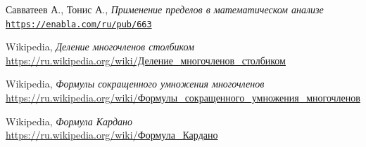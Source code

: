 \documentclass[12pt]{article}
\begin{document}
\begin{thebibliography}{9}
	Савватеев А., Тонис А., \textit{Применение пределов в математическом анализе}
	\\\texttt{\url{https://enabla.com/ru/pub/663}}
	
	Wikipedia, \textit{Деление многочленов столбиком}
	\\\href{https://ru.wikipedia.org/wiki/\%D0\%94\%D0\%B5\%D0\%BB\%D0\%B5\%D0\%BD\%D0\%B8\%D0\%B5_\%D0\%BC\%D0\%BD\%D0\%BE\%D0\%B3\%D0\%BE\%D1\%87\%D0\%BB\%D0\%B5\%D0\%BD\%D0\%BE\%D0\%B2_\%D1\%81\%D1\%82\%D0\%BE\%D0\%BB\%D0\%B1\%D0\%B8\%D0\%BA\%D0\%BE\%D0\%BC}{https://ru.wikipedia.org/wiki/Деление\_многочленов\_столбиком}

	Wikipedia, \textit{Формулы сокращенного умножения многочленов}
	\\\href{https://ru.wikipedia.org/wiki/\%D0\%A4\%D0\%BE\%D1\%80\%D0\%BC\%D1\%83\%D0\%BB\%D1\%8B\_\%D1\%81\%D0\%BE\%D0\%BA\%D1\%80\%D0\%B0\%D1\%89\%D1\%91\%D0\%BD\%D0\%BD\%D0\%BE\%D0\%B3\%D0\%BE\_\%D1\%83\%D0\%BC\%D0\%BD\%D0\%BE\%D0\%B6\%D0\%B5\%D0\%BD\%D0\%B8\%D1\%8F\_\%D0\%BC\%D0\%BD\%D0\%BE\%D0\%B3\%D0\%BE\%D1\%87\%D0\%BB\%D0\%B5\%D0\%BD\%D0\%BE\%D0\%B2}{https://ru.wikipedia.org/wiki/Формулы\_сокращенного\_умножения\_многочленов}

	Wikipedia, \textit{Формула Кардано}
	\\\href{https://ru.wikipedia.org/wiki/\%D0\%A4\%D0\%BE\%D1\%80\%D0\%BC\%D1\%83\%D0\%BB\%D0\%B0\_\%D0\%9A\%D0\%B0\%D1\%80\%D0\%B4\%D0\%B0\%D0\%BD\%D0\%BE}{https://ru.wikipedia.org/wiki/Формула\_Кардано}
\end{thebibliography}
\end{document}
